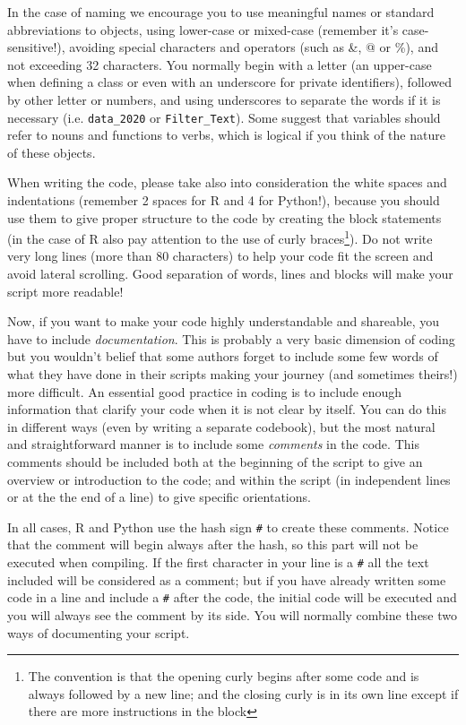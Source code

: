 In the case of naming we encourage you to use meaningful names or standard abbreviations to objects, using lower-case or mixed-case (remember it's case-sensitive!), avoiding special characters and operators (such as \&, @ or \%), and not exceeding 32 characters. You normally begin with a letter (an upper-case when defining a class or even with an underscore for private identifiers), followed by other letter or numbers, and using underscores to separate the words if it is necessary (i.e. \texttt{data\_2020} or \texttt{Filter\_Text}). Some suggest that variables should refer to nouns and functions to verbs, which is logical if you think of the nature of these objects. 

When writing the code, please take also into consideration the white spaces and indentations (remember 2 spaces for R and 4 for Python!), because you should use them to give proper structure to the code by creating the block statements (in the case of R also pay attention to the use of curly braces\footnote{The convention is that the opening curly begins after some code and is always followed by a new line; and the closing curly is in its own line except if there are more instructions in the block}). Do not write very long lines (more than 80 characters) to help your code fit the screen and avoid lateral scrolling. Good separation of words, lines and blocks will make your script more readable!

Now, if you want to make your code highly understandable and shareable, you have to include \textit{documentation}. This is probably a very basic dimension of coding but you wouldn't belief that some authors forget to include some few words of what they have done in their scripts making your journey (and sometimes theirs!) more difficult. An essential good practice in coding is to include enough information that clarify your code when it is not clear by itself. You can do this in different ways (even by writing a separate codebook), but the most natural and straightforward manner is to include some  \textit{comments} in the code. This comments should be included both at the beginning of the script to give an overview or introduction to the code; and within the script (in independent lines or at the the end of a line) to give specific orientations. 

In all cases, R and Python use the hash sign \texttt{\#} to create these comments. Notice that the comment will begin always after the hash, so this part will not be executed when compiling. If the first character in your line is  a \texttt{\#} all the text included will be considered as a comment; but if you have already written some code in a line and include a \texttt{\#} after the code, the initial code will be executed and you will always see the comment by its side. You will normally combine these two ways of documenting your script.

